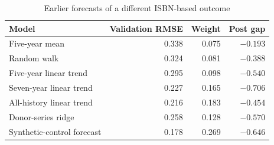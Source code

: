 \begin{table}[htbp]\centering\small
\caption{Earlier forecasts of a different ISBN-based outcome}\label{tab:ensemble}
\begin{tabular}{lrrr}\toprule
Model & Validation RMSE & Weight & Post gap\\\midrule
Five-year mean & 0.338 & 0.075 & $-0.193$\\
Random walk & 0.324 & 0.081 & $-0.388$\\
Five-year linear trend & 0.295 & 0.098 & $-0.540$\\
Seven-year linear trend & 0.227 & 0.165 & $-0.706$\\
All-history linear trend & 0.216 & 0.183 & $-0.454$\\
Donor-series ridge & 0.258 & 0.128 & $-0.570$\\
Synthetic-control forecast & 0.178 & 0.269 & $-0.646$\\
\bottomrule\end{tabular}
\end{table}
